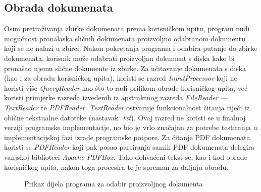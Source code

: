 \documentclass[times, utf8, zavrsni]{fer}
\begin{document}
\subsection{Obrada dokumenata}
Osim pretraživanja zbirke dokumenata prema korisničkom upitu, program nudi mogućnost pronalaska sličnih dokumenata proizvoljno odabranom dokumentu koji se ne nalazi u zbirci. Nakon pokretanja programa i odabira putanje do zbirke dokumenata, korisnik može odabrati proizvoljan dokument s diska kako bi pronašao njemu slične dokumente iz zbirke. Za učitavanje dokumenata s diska (kao i za obradu korisničkog upita), koristi se razred \textit{InputProcessor} koji ne koristi više \textit{QueryReader} kao što to radi prilikom obrade korisničkog upita, već koristi primjerke razreda izvedenih iz apstraktnog razreda \textit{FileReader} — \textit{TextReader} te \textit{PDFReader}. \textit{TextReader} ostvaruje funkcionalnost čitanja riječi iz obične tekstualne datoteke (nastavak \textit{.txt}). Ovaj razred ne koristi se u finalnoj verziji programske implementacije, no bio je vrlo značajan za potrebe testiranja u implementacijskoj fazi izrade programske potpore. Za čitanje PDF dokumenata koristi se \textit{PDFReader} koji pak posao parsiranja samih PDF dokumenata delegira vanjskoj biblioteci \textit{Apache PDFBox}. Tako dohvaćeni tekst se, kao i kod obrade korisničkog upita, nakon toga procesira te je spreman za daljnju obradu.
\begin{figure}
\caption{Prikaz dijela programa za odabir proizvoljnog dokumenta}
\label{img:doc_search}
\end{figure}
\end{document}
